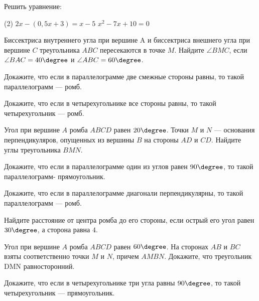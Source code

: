 \begin{class}[number=2]
	\begin{listofex}
			\item Решить уравнение:
		\begin{tasks}(2)
			\task \( 2x-(0,5x+3)=x-5 \)
			\task \( x^2-7x+10=0 \)
		\end{tasks}
		\item Биссектриса внутреннего угла при вершине A и биссектриса внешнего угла при вершине \( C \) треугольника \( ABC \)
		пересекаются в точке \( M \). Найдите \( \angle BMC \), если \( \angle BAC = 40\degree \) и \( \angle ABC = 60\degree \).
		\item Докажите, что если в параллелограмме две смежные стороны равны, то такой параллелограмм --- ромб.
		\item Докажите, что если в четырехугольнике все стороны равны, то такой четырехугольник --- ромб.
		\item Угол при вершине \( A \) ромба \( ABCD \) равен \( 20\degree \). Точки \( M \) и \( N \) --- основания перпендикуляров, опущенных из вершины \( B \) на стороны \( AD \) и \( CD \). Найдите углы треугольника \( BMN \).
		\item Докажите, что если в параллелограмме один из углов равен \( 90\degree \), то такой параллелограмм- прямоугольник.
	\end{listofex}
\end{class}

\begin{homework}[number=1]
	\begin{listofex}
		\item Докажите, что если в параллелограмме диагонали перпендикулярны, то такой параллелограмм --- ромб.
		\item Найдите расстояние от центра ромба до его стороны, если острый его угол равен \( 30\degree \), а сторона равна \( 4 \).
		\item Угол при вершине \( A \) ромба \( ABCD \) равен \( 60\degree \). На сторонах \( AB \) и \( BC \) взяты соответственно точки \( M \) и \( N \), причем \( AMBN \). Докажите, что треугольник DMN равносторонний.
		\item Докажите, что если в четырехугольнике три угла равны \( 90\degree \), то такой четырехугольник --- прямоугольник.
		\item \exercise{947}
	\end{listofex}
\end{homework}

